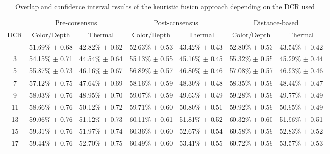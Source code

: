 \documentclass[10pt,twocolumn,letterpaper]{article}
\begin{document}
\begin{table}[ht]
\caption{Overlap and confidence interval results of the heuristic fusion approach depending on the DCR used}
\begin{center}
\begin{tabular}{c|c|c|c|c|c|c}
    & \multicolumn{2}{c|}{Pre-consensus} & \multicolumn{2}{c|}{Post-consensus} & \multicolumn{2}{c}{Distance-based} \\

    \cline{1-7}
    DCR & Color/Depth & Thermal & Color/Depth & Thermal & Color/Depth & Thermal\\
    \hline
    -  & 51.69\% $\pm$ 0.68 & 42.82\% $\pm$ 0.62 & 52.63\% $\pm$ 0.53 & 43.42\% $\pm$ 0.43 & 52.80\% $\pm$ 0.53 & 43.54\% $\pm$ 0.42 \\
    3 & 54.15\% $\pm$ 0.71 & 44.54\% $\pm$ 0.64  & 55.13\% $\pm$ 0.55 & 45.16\% $\pm$ 0.45 & 55.32\% $\pm$ 0.55 & 45.29\% $\pm$ 0.44 \\
    5 & 55.87\% $\pm$ 0.73 & 46.16\% $\pm$ 0.67  & 56.89\% $\pm$ 0.57 & 46.80\% $\pm$ 0.46 & 57.08\% $\pm$ 0.57 & 46.93\% $\pm$ 0.46 \\
    7 & 57.12\% $\pm$ 0.75 & 47.64\% $\pm$ 0.69  & 58.16\% $\pm$ 0.59 & 48.30\% $\pm$ 0.48 & 58.35\% $\pm$ 0.59 & 48.44\% $\pm$ 0.47 \\
    9 & 58.03\% $\pm$ 0.76 & 48.95\% $\pm$ 0.70  & 59.07\% $\pm$ 0.59 & 49.63\% $\pm$ 0.49 & 59.28\% $\pm$ 0.59 & 49.77\% $\pm$ 0.49 \\
    11 & 58.66\% $\pm$ 0.76 & 50.12\% $\pm$ 0.72  & 59.71\% $\pm$ 0.60 & 50.80\% $\pm$ 0.51 & 59.92\% $\pm$ 0.59 & 50.95\% $\pm$ 0.49 \\
    13 & 59.06\% $\pm$ 0.76 & 51.12\% $\pm$ 0.73  & 60.11\% $\pm$ 0.61 & 51.81\% $\pm$ 0.52 & 60.32\% $\pm$ 0.60 & 51.96\% $\pm$ 0.51 \\
    15 & 59.31\% $\pm$ 0.76 & 51.97\% $\pm$ 0.74  & 60.36\% $\pm$ 0.60 & 52.67\% $\pm$ 0.54 & 60.58\% $\pm$ 0.59 & 52.83\% $\pm$ 0.52 \\
    17 & 59.44\% $\pm$ 0.76 & 52.70\% $\pm$ 0.75  & 60.49\% $\pm$ 0.60 & 53.41\% $\pm$ 0.55 & 60.72\% $\pm$ 0.59 & 53.57\% $\pm$ 0.53 \\
\end{tabular}
\end{center}
\label{tab:simplefusion}
\end{table}
\end{document}
